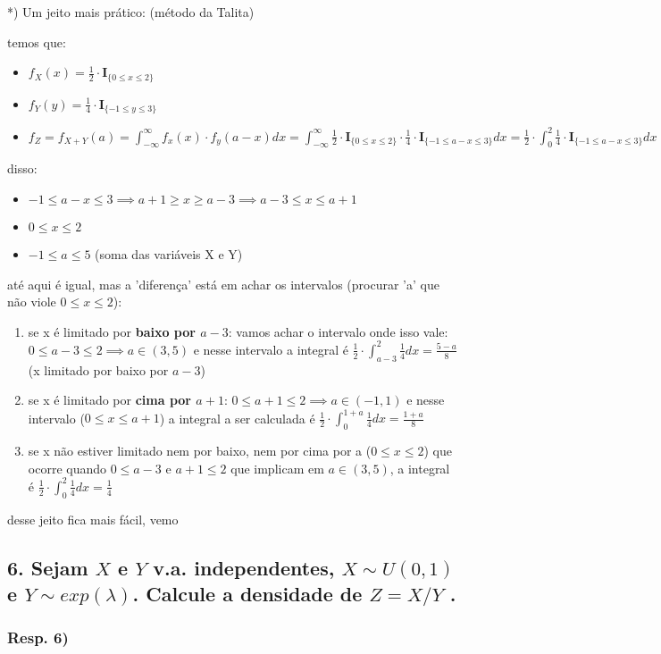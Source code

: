 \documentclass[english]{article}
\begin{document}
{*}) Um jeito mais prático: (método da Talita)

temos que:
\begin{itemize}
\item $f_{X}(x)=\frac{1}{2}\cdot\mathbf{I}_{\{0\leq x\leq2\}}$
\item $f_{Y}(y)=\frac{1}{4}\cdot\mathbf{I}_{\{-1\leq y\leq3\}}$
\item $f_{Z}=f_{X+Y}(a)=\int_{-\infty}^{\infty}f_{x}(x)\cdot f_{y}(a-x)dx=\int_{-\infty}^{\infty}\frac{1}{2}\cdot\mathbf{I}_{\{0\leq x\leq2\}}\cdot\frac{1}{4}\cdot\mathbf{I}_{\{-1\leq a-x\leq3\}}dx=\frac{1}{2}\cdot\int_{0}^{2}\frac{1}{4}\cdot\mathbf{I}_{\{-1\leq a-x\leq3\}}dx$
\end{itemize}
disso:
\begin{itemize}
\item $-1\leq a-x\leq3\implies a+1\geq x\geq a-3\implies a-3\leq x\leq a+1$
\item $0\leq x\leq2$
\item $-1\leq a\leq5$ (soma das variáveis X e Y)
\end{itemize}
até aqui é igual, mas a 'diferença' está em achar os intervalos (procurar
'a' que não viole $0\leq x\leq2$):
\begin{enumerate}
\item se x é limitado por \textbf{baixo por $a-3$}: vamos achar o intervalo
onde isso vale: $0\leq a-3\leq2\implies a\in(3,5)$ e nesse intervalo
a integral é $\frac{1}{2}\cdot\int_{a-3}^{2}\frac{1}{4}dx=\frac{5-a}{8}$
(x limitado por baixo por $a-3$)
\item se x é limitado por \textbf{cima por $a+1$}: $0\leq a+1\leq2\implies a\in(-1,1)$
e nesse intervalo ($0\leq x\leq a+1$) a integral a ser calculada
é $\frac{1}{2}\cdot\int_{0}^{1+a}\frac{1}{4}dx=\frac{1+a}{8}$
\item se x não estiver limitado nem por baixo, nem por cima por a ($0\leq x\leq2$)
que ocorre quando $0\leq a-3$ e $a+1\leq2$ que implicam em $a\in(3,5)$,
a integral é $\frac{1}{2}\cdot\int_{0}^{2}\frac{1}{4}dx=\frac{1}{4}$
\end{enumerate}
desse jeito fica mais fácil, vemo


\subsection*{\textmd{6. Sejam $X$ e $Y$ v.a. independentes, $X\sim U(0,1)$
e $Y\sim exp(\lambda)$. Calcule a densidade de $Z=X/Y$ . }}


\subsubsection*{\textmd{Resp. 6)}}
\end{document}
